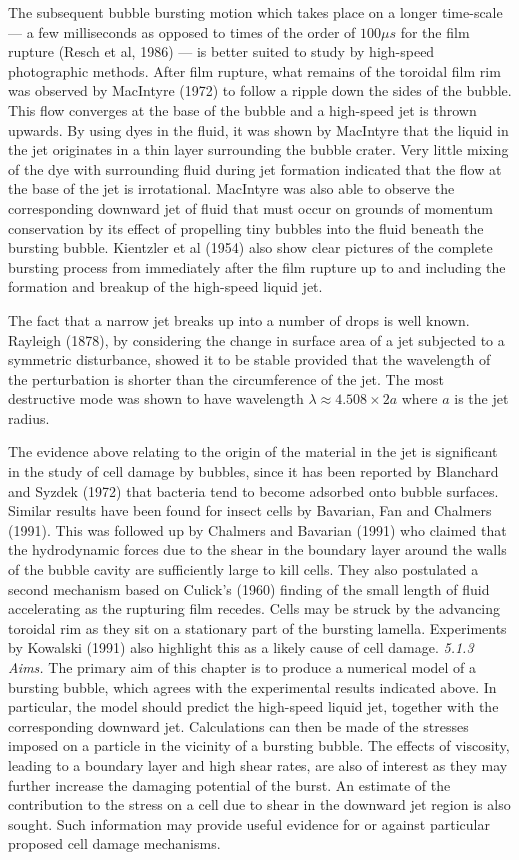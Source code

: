 The subsequent bubble bursting motion which takes place on a longer
time-scale --- a few milliseconds as opposed to
times of the order of $100\mu s$ for the film rupture (Resch et al, 1986)
--- is better suited to study by high-speed photographic methods. 
After film rupture, 
what remains of the toroidal film rim was observed by MacIntyre (1972)
to follow a ripple down the sides of the bubble. This flow converges at the 
base of the bubble and a high-speed jet is thrown upwards.
By using dyes in the fluid, it was shown by MacIntyre
that the liquid in the jet originates in a thin layer surrounding the 
bubble crater.
Very little mixing of the dye with surrounding fluid during jet formation 
indicated that the flow at the base of the jet is irrotational. MacIntyre was also able
to observe the corresponding downward jet of fluid that must occur on
grounds of momentum conservation by its effect of propelling tiny bubbles
into the fluid beneath the bursting bubble.
Kientzler et al (1954) also show clear pictures of the complete bursting process
from immediately after the film rupture up to and including the formation and breakup
of the high-speed liquid jet. 

The fact that a narrow jet breaks up into a number of drops is well known.
Rayleigh (1878), by considering the change in surface area
of a jet subjected to a symmetric disturbance, showed it to be stable provided
that the wavelength of the perturbation is shorter than 
the circumference of the
jet. The  most destructive mode was shown to have wavelength
$\lambda\approx 4.508\times 2a$ where $a$ is the jet radius.

The evidence above relating to the origin of the material in the jet 
is significant in the study of cell damage by bubbles, since 
it has been reported by Blanchard and Syzdek (1972) that bacteria 
tend to become adsorbed onto bubble surfaces. Similar results have been
found for insect cells by Bavarian, Fan and Chalmers (1991). This 
was followed up by Chalmers and Bavarian (1991) who claimed
that the hydrodynamic forces due to the shear in the boundary layer
around the walls of the bubble cavity
are sufficiently large to kill cells. They
also postulated a second mechanism based on Culick's (1960)
finding of the small length
of fluid accelerating as the rupturing film recedes.
Cells may be struck by the advancing toroidal rim as they sit on
a stationary part of the bursting lamella. Experiments
by Kowalski (1991) also highlight this as a likely cause of
cell damage.
\vskip 15pt
\c {\it 5.1.3 Aims.}
\vskip 5pt
The primary aim of this chapter is to produce a numerical
model of a bursting bubble, which agrees with the experimental 
results indicated above. In particular, the model should predict 
the high-speed liquid jet, together with
the corresponding downward jet.
Calculations can then be made of the stresses imposed on a particle
in the vicinity of a bursting bubble.
The effects of viscosity, leading to a boundary layer and high shear rates, are 
also of interest as they may further increase the damaging potential of the
burst. An estimate of the contribution to the stress on a cell
due to shear in the downward jet region is also sought. Such information
may provide useful evidence for or against particular
proposed cell damage mechanisms. 

